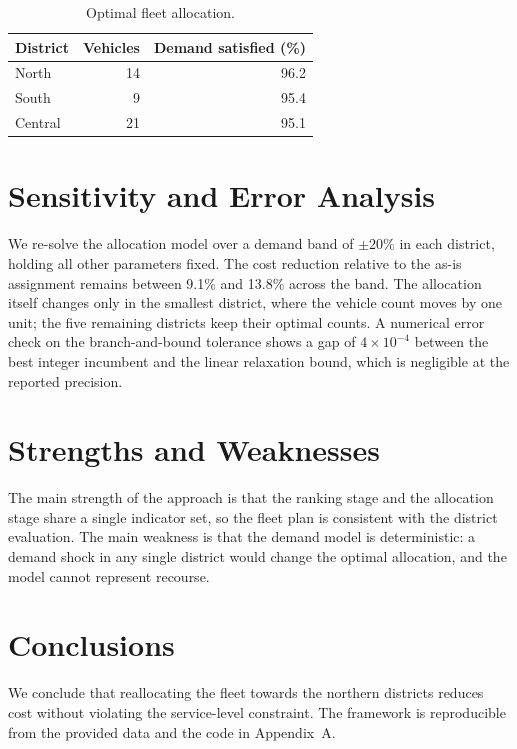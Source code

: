 \documentclass[12pt]{article}
\begin{document}
\begin{table}[h]
\centering
\caption{Optimal fleet allocation.}
\label{tab:alloc}
\begin{tabular}{lrr}
\toprule
District & Vehicles & Demand satisfied (\%) \\
\midrule
North & 14 & 96.2 \\
South & 9  & 95.4 \\
Central & 21 & 95.1 \\
\bottomrule
\end{tabular}
\end{table}

\section{Sensitivity and Error Analysis}

We re-solve the allocation model over a demand band of $\pm 20\%$ in each
district, holding all other parameters fixed. The cost reduction relative to the
as-is assignment remains between 9.1\% and 13.8\% across the band. The allocation
itself changes only in the smallest district, where the vehicle count moves by
one unit; the five remaining districts keep their optimal counts. A numerical
error check on the branch-and-bound tolerance shows a gap of $4\times10^{-4}$
between the best integer incumbent and the linear relaxation bound, which is
negligible at the reported precision.

\section{Strengths and Weaknesses}

The main strength of the approach is that the ranking stage and the allocation
stage share a single indicator set, so the fleet plan is consistent with the
district evaluation. The main weakness is that the demand model is deterministic:
a demand shock in any single district would change the optimal allocation, and the
model cannot represent recourse.

\section{Conclusions}

We conclude that reallocating the fleet towards the northern districts reduces
cost without violating the service-level constraint. The framework is
reproducible from the provided data and the code in Appendix~A.
\end{document}
